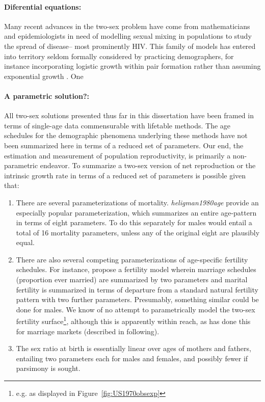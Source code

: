 \paragraph{Diferential equations: } Many recent advances in the two-sex problem
have come from mathematicians and epidemiologists in need of modelling sexual mixing in
populations to study the spread of disease-- most prominently HIV. This family
of models has entered into territory seldom formally considered by practicing
demographers, for instance incorporating logistic growth within pair
formation rather than assuming exponential growth \citep{castillo1995logistic}.
One 

\citet{schmitz2000note}

\paragraph{A parametric solution?: } All two-sex solutions presented thus far in
this dissertation have been framed in terms of single-age data commensurable with lifetable
methods. The age schedules for the demographic phenomena underlying these
methods have not been summarized here in terms of a reduced set of parameters.
Our end, the estimation and measurement of population reproductivity, is primarily 
a non-parametric endeavor. To summarize a two-sex version of net reproduction or
the intrinsic growth rate in terms of a reduced set of parameters is
possible given that: 
\begin{enumerate}
  \item There are several parameterizations of mortality.
  \textit{heligman1980age} provide an especially popular parameterization, which 
  summarizes an entire age-pattern in terms of eight parameters. To do this
  separately for males would entail a total of 16 mortality parameters, unless
  any of the original eight are plausibly equal.
  \item There are also several competing parameterizations of age-specific
  fertility schedules. For instance, \citet{coale1974model} propose a fertility
  model wherein marriage schedules (proportion ever married) are summarized by
  two parameters and marital fertility is summarized in terms of departure from
  a standard natural fertility pattern with two further parameters. Presumably,
  something similar could be done for males. We know of no attempt to
  parametrically model the two-sex fertility surface\footnote{e.g. as displayed
  in Figure~\ref{fig:US1970obsexp}}, although this is apparently within reach,
  as \citet{marriage1981warren,
sanderson1983two} has done this for marriage markets (described in following).
  \item The sex ratio at birth is essentially linear over ages of mothers and
  fathers, entailing two parameters each for males and females, and possibly
  fewer if parsimony is sought.
\end{enumerate}

